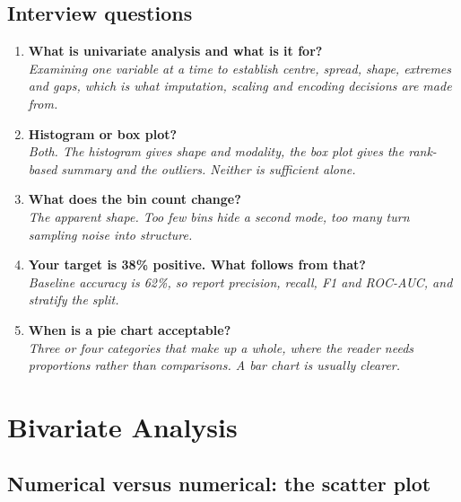 \documentclass[11pt,a4paper]{article}
\begin{document}
\subsection*{Interview questions}

\begin{enumerate}\itemsep4pt
  \item \textbf{What is univariate analysis and what is it for?}\\
        \emph{Examining one variable at a time to establish centre, spread, shape, extremes
        and gaps, which is what imputation, scaling and encoding decisions are made from.}
  \item \textbf{Histogram or box plot?}\\
        \emph{Both. The histogram gives shape and modality, the box plot gives the
        rank-based summary and the outliers. Neither is sufficient alone.}
  \item \textbf{What does the bin count change?}\\
        \emph{The apparent shape. Too few bins hide a second mode, too many turn sampling
        noise into structure.}
  \item \textbf{Your target is 38\% positive. What follows from that?}\\
        \emph{Baseline accuracy is 62\%, so report precision, recall, F1 and ROC-AUC, and
        stratify the split.}
  \item \textbf{When is a pie chart acceptable?}\\
        \emph{Three or four categories that make up a whole, where the reader needs
        proportions rather than comparisons. A bar chart is usually clearer.}
\end{enumerate}

\newpage
\section{Bivariate Analysis}



\subsection{Numerical versus numerical: the scatter plot}
\end{document}
